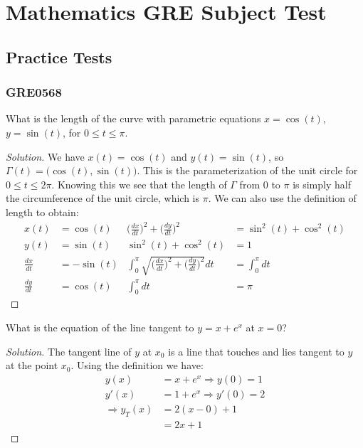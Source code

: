\documentclass[crop=false,class=article,oneside]{standalone}
\begin{document}
    \ifx\ifcoursesmathgre\undefined
        \section*{Mathematics GRE Subject Test}
        \setcounter{section}{1}
    \fi
    \subsection{Practice Tests}
        \subsubsection{GRE0568}
        \begin{problem}
            What is the length of the curve with
            parametric equations
            $x=\cos(t)$, $y=\sin(t)$, for $0\leq t\leq\pi$.
        \end{problem}
        \begin{proof}[Solution]
            We have $x(t)=\cos(t)$ and $y(t)=\sin(t)$, so
            $\Gamma(t)=\big(\cos(t),\sin(t)\big)$. This is the
            parameterization of the unit circle for
            $0\leq t\leq 2\pi$. Knowing this we see that the length
            of $\Gamma$ from $0$ to $\pi$ is simply half the
            circumference of the unit circle, which is $\pi$. We can
            also use the definition of length to obtain:
            \begin{align*}
                x(t)&=\cos(t)&
                \Big(\frac{dx}{dt}\Big)^{2}+
                \Big(\frac{dy}{dt}\Big)^{2}
                &=\sin^{2}(t)+\cos^{2}(t)\\                
                y(t)&=\sin(t)
                &\sin^{2}(t)+\cos^{2}(t)&=1\\
                \frac{dx}{dt}&=-\sin(t)
                &\int_{0}^{\pi}\sqrt{\Big(\frac{dx}{dt}\Big)^{2}+
                \Big(\frac{dy}{dt}\Big)^{2}}dt
                &=\int_{0}^{\pi}dt\\
                \frac{dy}{dt}&=\cos(t)&
                \int_{0}^{\pi}dt&=\pi
            \end{align*}
        \end{proof}
        \begin{problem}
            What is the equation of the line tangent to $y=x+e^x$
            at $x=0$?
        \end{problem}
        \begin{proof}[Solution]
            The tangent line of $y$ at $x_{0}$
            is a line that touches
            and lies tangent to $y$ at the point $x_{0}$. Using the
            definition we have:
            \begin{align*}
                y(x)&=x+e^{x}\Rightarrow y(0)=1\\
                y'(x)&=1+e^{x}\Rightarrow y'(0)=2\\
                \Rightarrow y_{T}(x)&=2(x-0)+1\\
                &=2x+1
            \end{align*}
        \end{proof}
\end{document}
